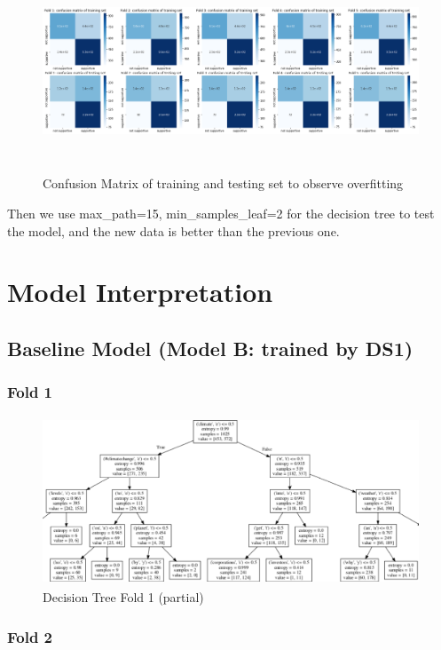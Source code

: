 \documentclass{article} %
\begin{document}
\begin{figure}[H]
	\includegraphics[height=6cm, width=17cm]{1.png}
	\caption{Confusion Matrix of training and testing set to observe overfitting}
\end{figure}

Then we use max\_path=15, min\_samples\_leaf=2 for the decision tree to test the model, and the new data is better than the previous one.


\section{Model Interpretation}

\subsection{Baseline Model (Model B: trained by DS1)}

\label{token:tuple}
\subsubsection{Fold 1}

\begin{figure}[H]
	\includegraphics[height=5cm, width=17cm]{6.png}
	\caption{Decision Tree Fold 1 (partial)}
\end{figure}

\subsubsection{Fold 2}
\end{document}
